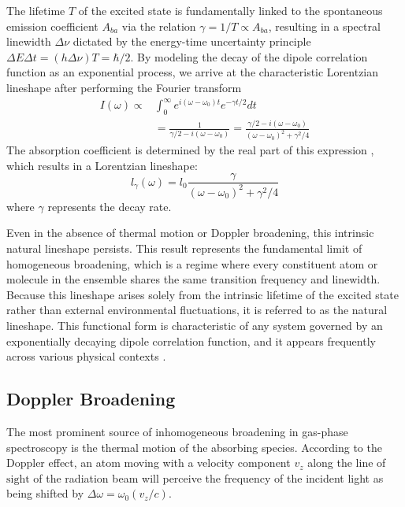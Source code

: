 \documentclass[12pt]{report}
\begin{document}
	The lifetime $T$ of the excited state is fundamentally linked to the spontaneous emission coefficient $A_{ba}$ via the relation $\gamma = 1/T \propto A_{ba}$, resulting in a spectral linewidth $\Delta \nu$ dictated by the energy-time uncertainty principle $\Delta E \Delta t = (h\Delta \nu) T = \hbar /2$. By modeling the decay of the dipole correlation function as an exponential process, we arrive at the characteristic Lorentzian lineshape after performing the Fourier transform
	\begin{align}
		I(\omega) \propto& \int_{0}^{\infty} e^{i (\omega - \omega_0)t} e^{-\gamma t / 2} dt \nonumber\\
		&= \frac{1}{\gamma /2 - i(\omega - \omega_0)} = \frac{\gamma /2 - i(\omega - \omega_0)}{(\omega - \omega_0)^2 + \gamma^2 /4}
	\end{align}
	The absorption coefficient is determined by the real part of this expression \cite{book_molecules_and_radiation}, which results in a Lorentzian lineshape:
	\begin{equation} \label{ls_lorentzian}
		l_\gamma(\omega) = l_0 \frac{\gamma}{(\omega - \omega_0)^2 + \gamma^2/4}
	\end{equation}
	where $\gamma$ represents the decay rate.
	
	Even in the absence of thermal motion or Doppler broadening, this intrinsic natural lineshape persists. This result represents the fundamental limit of homogeneous broadening, which is a regime where every constituent atom or molecule in the ensemble shares the same transition frequency and linewidth. Because this lineshape arises solely from the intrinsic lifetime of the excited state rather than external environmental fluctuations, it is referred to as the natural lineshape. This functional form is characteristic of any system governed by an exponentially decaying dipole correlation function, and it appears frequently across various physical contexts \cite{book_foot2005atomic, book_fourier}.
	
	\subsection{Doppler Broadening}
	The most prominent source of inhomogeneous broadening in gas-phase spectroscopy is the thermal motion of the absorbing species. According to the Doppler effect, an atom moving with a velocity component $v_z$ along the line of $\text{sight}$ of the radiation beam will perceive the frequency of the incident light as being shifted by $\Delta \omega = \omega_0 (v_z/c)$. 
	
\end{document}
